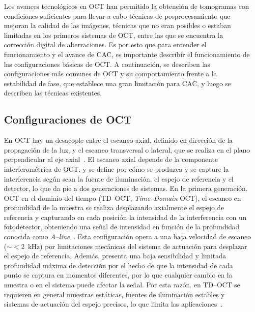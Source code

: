 \documentclass[letter, 12 pt]{article}
\begin{document}
Los avances tecnológicos en OCT han permitido la obtención de tomogramas con condiciones suficientes para llevar a cabo técnicas de posprocesamiento que mejoran la calidad de las imágenes, técnicas que no eran posibles o estaban limitadas en los primeros sistemas de OCT, entre las que se encuentra la corrección digital de aberraciones. Es por esto que para entender el funcionamiento y el avance de CAC, es importante describir el funcionamiento de las configuraciones básicas de OCT. A continuación, se describen las configuraciones más comunes de OCT y su comportamiento frente a la estabilidad de fase, que establece una gran limitación para CAC, y luego se describen las técnicas existentes.

	\subsection{Configuraciones de OCT}

En OCT hay un desacople entre el escaneo axial, definido en dirección de la propagación de la luz, y el escaneo transversal o lateral, que se realiza en el plano perpendicular al eje axial~\cite{drexler2015}. El escaneo axial depende de la componente interferométrica de OCT, y se define por cómo se produzca y se capture la interferencia según sean la fuente de iluminación, el espejo de referencia y el detector, lo que da pie a dos generaciones de sistemas. En la primera generación, OCT en el dominio del tiempo (TD--OCT, \textit{Time--Domain} OCT), el escaneo en profundidad de la muestra se realiza desplazando axialmente el espejo de referencia y capturando en cada posición la intensidad de la interferencia con un fotodetector, obteniendo una señal de intensidad en función de la profundidad conocida como \textit{A--line}~\cite{huang1991}. Esta configuración opera a una baja velocidad de escaneo ($\sim<$2~kHz) por limitaciones mecánicas del sistema de actuación para desplazar el espejo de referencia. Además, presenta una baja sensibilidad y limitada profundidad máxima de detección por el hecho de que la intensidad de cada punto se captura en momentos diferentes, por lo que cualquier cambio en la muestra o en el sistema puede afectar la señal. Por esta razón, en TD--OCT se requieren en general muestras estáticas, fuentes de iluminación estables y sistemas de actuación del espejo precisos, lo que limita las aplicaciones~\cite{drexler2015}. \\
\end{document}
